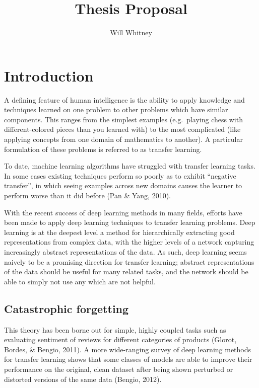 \documentclass[]{article}
\title{Thesis Proposal}
\author{Will Whitney}
\date{}
\begin{document}
\maketitle

\section{Introduction}\label{introduction}

A defining feature of human intelligence is the ability to apply
knowledge and techniques learned on one problem to other problems which
have similar components. This ranges from the simplest examples
(e.g.~playing chess with different-colored pieces than you learned with)
to the most complicated (like applying concepts from one domain of
mathematics to another). A particular formulation of these problems is
referred to as transfer learning.

To date, machine learning algorithms have struggled with transfer
learning tasks. In some cases existing techniques perform so poorly as
to exhibit ``negative transfer'', in which seeing examples across new
domains causes the learner to perform worse than it did before (Pan \&
Yang, 2010).

With the recent success of deep learning methods in many fields, efforts
have been made to apply deep learning techniques to transfer learning
problems. Deep learning is at the deepest level a method for
hierarchically extracting good representations from complex data, with
the higher levels of a network capturing increasingly abstract
representations of the data. As such, deep learning seems naively to be
a promising direction for transfer learning; abstract representations of
the data should be useful for many related tasks, and the network should
be able to simply not use any which are not helpful.

\subsection{Catastrophic forgetting}\label{catastrophic-forgetting}

This theory has been borne out for simple, highly coupled tasks such as
evaluating sentiment of reviews for different categories of products
(Glorot, Bordes, \& Bengio, 2011). A more wide-ranging survey of deep
learning methods for transfer learning shows that some classes of models
are able to improve their performance on the original, clean dataset
after being shown perturbed or distorted versions of the same data
(Bengio, 2012).
\end{document}
